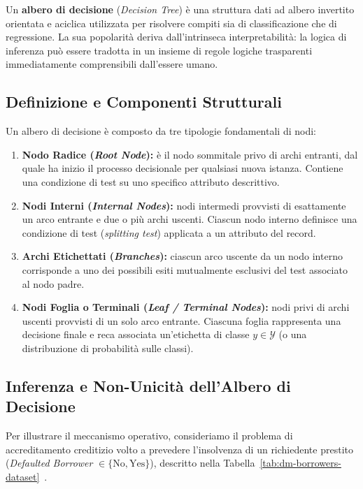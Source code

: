 Un \textbf{albero di decisione} (\textit{Decision Tree}) è una struttura dati ad albero invertito orientata e aciclica utilizzata per risolvere compiti sia di classificazione che di regressione. La sua popolarità deriva dall'intrinseca interpretabilità: la logica di inferenza può essere tradotta in un insieme di regole logiche trasparenti immediatamente comprensibili dall'essere umano.

\FloatBarrier
\subsection{Definizione e Componenti Strutturali}
\label{subsec:dm-tree-components}

Un albero di decisione è composto da tre tipologie fondamentali di nodi:
\begin{enumerate}
    \item \textbf{Nodo Radice (\textit{Root Node}):} è il nodo sommitale privo di archi entranti, dal quale ha inizio il processo decisionale per qualsiasi nuova istanza. Contiene una condizione di test su uno specifico attributo descrittivo.
    \item \textbf{Nodi Interni (\textit{Internal Nodes}):} nodi intermedi provvisti di esattamente un arco entrante e due o più archi uscenti. Ciascun nodo interno definisce una condizione di test (\textit{splitting test}) applicata a un attributo del record.
    \item \textbf{Archi Etichettati (\textit{Branches}):} ciascun arco uscente da un nodo interno corrisponde a uno dei possibili esiti mutualmente esclusivi del test associato al nodo padre.
    \item \textbf{Nodi Foglia o Terminali (\textit{Leaf / Terminal Nodes}):} nodi privi di archi uscenti provvisti di un solo arco entrante. Ciascuna foglia rappresenta una decisione finale e reca associata un'etichetta di classe $y \in \mathcal{Y}$ (o una distribuzione di probabilità sulle classi).
\end{enumerate}

\FloatBarrier
\subsection{Inferenza e Non-Unicità dell'Albero di Decisione}
\label{subsec:dm-tree-inference-nonuniqueness}

Per illustrare il meccanismo operativo, consideriamo il problema di accreditamento creditizio volto a prevedere l'insolvenza di un richiedente prestito (\textit{Defaulted Borrower} $\in \{\text{No}, \text{Yes}\}$), descritto nella Tabella~\ref{tab:dm-borrowers-dataset}~\cite{tan2018}.

